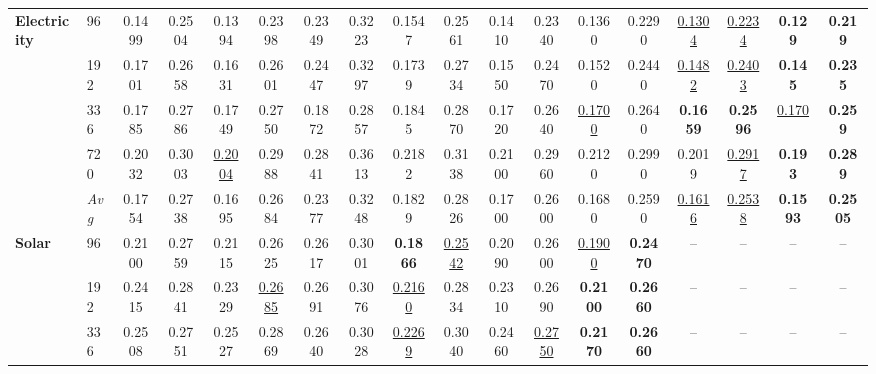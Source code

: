 \begin{tabular}{llcccccccccccccccc}
\midrule
\textbf{Electricity} & 96         &         0.1499 &         0.2504 &         0.1394 &         0.2398 &         0.2349 &         0.3223 &         0.1547 &         0.2561 &         0.1410 &         0.2340 &         0.1360 &         0.2290 & \underline{0.1304} & \underline{0.2234} & \textbf{0.129} & \textbf{0.219} \\
               & 192        &         0.1701 &         0.2658 &         0.1631 &         0.2601 &         0.2447 &         0.3297 &         0.1739 &         0.2734 &         0.1550 &         0.2470 &         0.1520 &         0.2440 & \underline{0.1482} & \underline{0.2403} & \textbf{0.145} & \textbf{0.235} \\
               & 336        &         0.1785 &         0.2786 &         0.1749 &         0.2750 &         0.1872 &         0.2857 &         0.1845 &         0.2870 &         0.1720 &         0.2640 & \underline{0.1700} &         0.2640 & \textbf{0.1659} & \textbf{0.2596} & \underline{0.170} & \textbf{0.259} \\
               & 720        &         0.2032 &         0.3003 & \underline{0.2004} &         0.2988 &         0.2841 &         0.3613 &         0.2182 &         0.3138 &         0.2100 &         0.2960 &         0.2120 &         0.2990 &         0.2019 & \underline{0.2917} & \textbf{0.193} & \textbf{0.289} \\
               & \textit{Avg} &         0.1754 &         0.2738 &         0.1695 &         0.2684 &         0.2377 &         0.3248 &         0.1829 &         0.2826 &         0.1700 &         0.2600 &         0.1680 &         0.2590 & \underline{0.1616} & \underline{0.2538} & \textbf{0.1593} & \textbf{0.2505} \\
\midrule
\textbf{Solar} & 96         &         0.2100 &         0.2759 &         0.2115 &         0.2625 &         0.2617 &         0.3001 & \textbf{0.1866} & \underline{0.2542} &         0.2090 &         0.2600 & \underline{0.1900} & \textbf{0.2470} &             -- &             -- &             -- &             -- \\
               & 192        &         0.2415 &         0.2841 &         0.2329 & \underline{0.2685} &         0.2691 &         0.3076 & \underline{0.2160} &         0.2834 &         0.2310 &         0.2690 & \textbf{0.2100} & \textbf{0.2660} &             -- &             -- &             -- &             -- \\
               & 336        &         0.2508 &         0.2751 &         0.2527 &         0.2869 &         0.2640 &         0.3028 & \underline{0.2269} &         0.3040 &         0.2460 & \underline{0.2750} & \textbf{0.2170} & \textbf{0.2660} &             -- &             -- &             -- &             -- \\

\end{tabular}

